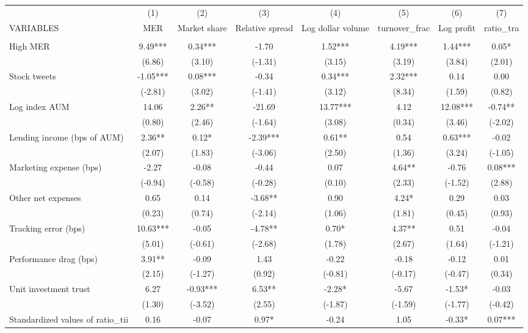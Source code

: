 \documentclass[]{article}
\begin{document}
\begin{tabular}{lccccccc} \hline
 & (1) & (2) & (3) & (4) & (5) & (6) & (7) \\
VARIABLES & MER & Market share & Relative spread & Log dollar volume & turnover\_frac & Log profit & ratio\_tra \\ \hline
 &  &  &  &  &  &  &  \\
High MER & 9.49*** & 0.34*** & -1.70 & 1.52*** & 4.19*** & 1.44*** & 0.05* \\
 & (6.86) & (3.10) & (-1.31) & (3.15) & (3.19) & (3.84) & (2.01) \\
Stock tweets & -1.05*** & 0.08*** & -0.34 & 0.34*** & 2.32*** & 0.14 & 0.00 \\
 & (-2.81) & (3.02) & (-1.41) & (3.12) & (8.34) & (1.59) & (0.82) \\
Log index AUM & 14.06 & 2.26** & -21.69 & 13.77*** & 4.12 & 12.08*** & -0.74** \\
 & (0.80) & (2.46) & (-1.64) & (3.08) & (0.34) & (3.46) & (-2.02) \\
Lending income (bps of AUM) & 2.36** & 0.12* & -2.39*** & 0.61** & 0.54 & 0.63*** & -0.02 \\
 & (2.07) & (1.83) & (-3.06) & (2.50) & (1.36) & (3.24) & (-1.05) \\
Marketing expense (bps) & -2.27 & -0.08 & -0.44 & 0.07 & 4.64** & -0.76 & 0.08*** \\
 & (-0.94) & (-0.58) & (-0.28) & (0.10) & (2.33) & (-1.52) & (2.88) \\
Other net expenses & 0.65 & 0.14 & -3.68** & 0.90 & 4.24* & 0.29 & 0.03 \\
 & (0.23) & (0.74) & (-2.14) & (1.06) & (1.81) & (0.45) & (0.93) \\
Tracking error (bps) & 10.63*** & -0.05 & -4.78** & 0.70* & 4.37** & 0.51 & -0.04 \\
 & (5.01) & (-0.61) & (-2.68) & (1.78) & (2.67) & (1.64) & (-1.21) \\
Performance drag (bps) & 3.91** & -0.09 & 1.43 & -0.22 & -0.18 & -0.12 & 0.01 \\
 & (2.15) & (-1.27) & (0.92) & (-0.81) & (-0.17) & (-0.47) & (0.34) \\
Unit investment trust & 6.27 & -0.93*** & 6.53** & -2.28* & -5.67 & -1.53* & -0.03 \\
 & (1.30) & (-3.52) & (2.55) & (-1.87) & (-1.59) & (-1.77) & (-0.42) \\
Standardized values of ratio\_tii & 0.16 & -0.07 & 0.97* & -0.24 & 1.05 & -0.33* & 0.07*** \\

\end{tabular}
\end{document}
